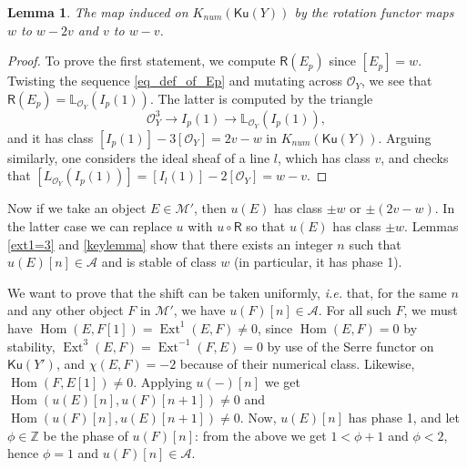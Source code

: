 \documentclass[11pt]{amsart}
\newtheorem{lemma}[thm]{Lemma}
\theoremstyle{definition}
\newcommand{\Z}{\mathbb{Z}}
\newcommand{\lperp}[1]{\leftidx{^{\perp}}{#1}{}}
\DeclareMathOperator{\Hom}{Hom}
\DeclareMathOperator{\Ext}{Ext}
\newcommand{\sA}{\mathcal{A}}
\newcommand{\sO}{\mathcal{O}}
\newcommand{\AAA}[1]{\textcolor{red}{#1}}
\newcommand{\Ku}{\mathsf{Ku}}
\begin{document}
\begin{lemma}\label{numfix}
The map induced on $K_{num}(\Ku(Y))$ by the rotation functor maps $w$ to $w-2v$ and $v$ to $w-v$.
\end{lemma}
\begin{proof}
To prove the first statement, we compute $\mathsf R(E_p)$ since $[E_p]=w$. Twisting the sequence \eqref{eq_def_of_Ep} and mutating across $\sO_Y$, we see that $\mathsf R(E_p)=\mathbb L_{\sO_Y} (I_p(1))$. The latter is computed by the triangle
\begin{equation}
    \label{eq_def_of_Mp} \sO_Y^{3} \to I_p(1)\to \mathbb L_{\sO_Y} (I_p(1)),
\end{equation}
and it has class $[I_p(1)]-3[\sO_Y]=2v-w$ in $K_{num}(\Ku(Y))$. Arguing similarly, one considers the ideal sheaf of a line $l$, which has class $v$, and checks that $[L_{\sO_Y} (I_p(1))]=[I_l(1)]-2[\sO_Y]=w-v$.
\end{proof}




Now if we take an object $E \in \mathcal{M}'$, then $u(E)$ has class $\pm w$ or $\pm(2v-w)$. In the latter case we can replace $u$ with $u\circ \mathsf R$ so that $u(E)$ has class $\pm w$.  Lemmas \ref{ext1=3} and \ref{keylemma} show that there exists an integer $n$ such that $u(E)[n] \in \mathcal{A}$ and is stable of class $w$ (in particular, it has phase 1). 

We want to prove that the shift can be taken uniformly, \textit{i.e.} that, for the same $n$ and any other object $F$ in $\mathcal{M}'$, we have $u(F)[n]\in\sA$. For all such $F$, we must have $\Hom(E,F[1])=\Ext^1(E,F)\neq 0$, since $\Hom(E,F)=0$ by stability, $\Ext^3(E,F)=\Ext^{-1}(F,E)=0$ by use of the Serre functor on $\Ku(Y')$, and $\chi(E,F)=-2$ because of their numerical class. Likewise, $\Hom(F,E[1])\neq 0$. Applying $u(-)[n]$ we get $\Hom(u(E)[n],u(F)[n+1])\neq 0$ and $\Hom(u(F)[n],u(E)[n+1])\neq 0$. Now, $u(E)[n]$ has phase 1, and let $\phi \in \Z$ be the phase of $u(F)[n]$: from the above we get $1< \phi +1$ and $\phi<2$, hence $\phi=1$ and $u(F)[n]\in \sA$.
\end{document}

